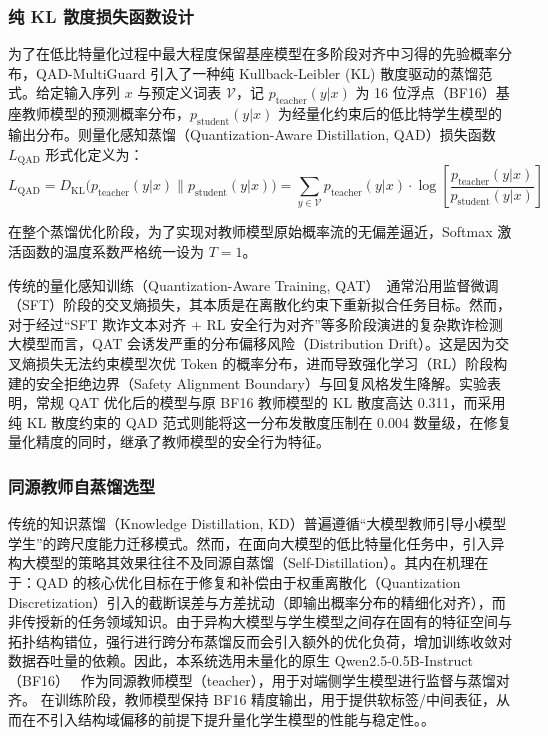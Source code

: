 \documentclass[11pt, a4paper]{article}
\begin{document}
\subsubsection{纯 KL 散度损失函数设计}

为了在低比特量化过程中最大程度保留基座模型在多阶段对齐中习得的先验概率分布，QAD-MultiGuard 引入了一种纯 Kullback-Leibler (KL) 散度驱动的蒸馏范式。给定输入序列 $x$ 与预定义词表 $\mathcal{V}$，记 $p_{\text{teacher}}(y|x)$ 为 16 位浮点（BF16）基座教师模型的预测概率分布，$p_{\text{student}}(y|x)$ 为经量化约束后的低比特学生模型的输出分布。则量化感知蒸馏（Quantization-Aware Distillation, QAD）损失函数 $L_{\text{QAD}}$ 形式化定义为：
\begin{equation}
    L_{\text{QAD}} = D_{\text{KL}}\big( p_{\text{teacher}}(y|x) \parallel p_{\text{student}}(y|x) \big) = \sum_{y \in \mathcal{V}} p_{\text{teacher}}(y|x) \cdot \log \left[ \frac{p_{\text{teacher}}(y|x)}{p_{\text{student}}(y|x)} \right]
\end{equation}

在整个蒸馏优化阶段，为了实现对教师模型原始概率流的无偏差逼近，Softmax 激活函数的温度系数严格统一设为 $T = 1$。

传统的量化感知训练（Quantization-Aware Training, QAT）~\cite{24,25,26}通常沿用监督微调（SFT）阶段的交叉熵损失，其本质是在离散化约束下重新拟合任务目标。然而，对于经过“SFT 欺诈文本对齐 + RL 安全行为对齐”等多阶段演进的复杂欺诈检测大模型而言，QAT 会诱发严重的分布偏移风险（Distribution Drift）。这是因为交叉熵损失无法约束模型次优 Token 的概率分布，进而导致强化学习（RL）阶段构建的安全拒绝边界（Safety Alignment Boundary）与回复风格发生降解。实验表明，常规 QAT 优化后的模型与原 BF16 教师模型的 KL 散度高达 0.311，而采用纯 KL 散度约束的 QAD 范式则能将这一分布发散度压制在 0.004 数量级，在修复量化精度的同时，继承了教师模型的安全行为特征。

\subsubsection{同源教师自蒸馏选型}

传统的知识蒸馏（Knowledge Distillation, KD）普遍遵循“大模型教师引导小模型学生”的跨尺度能力迁移模式。然而，在面向大模型的低比特量化任务中，引入异构大模型的策略其效果往往不及同源自蒸馏（Self-Distillation）。其内在机理在于：QAD 的核心优化目标在于修复和补偿由于权重离散化（Quantization Discretization）引入的截断误差与方差扰动（即输出概率分布的精细化对齐），而非传授新的任务领域知识。由于异构大模型与学生模型之间存在固有的特征空间与拓扑结构错位，强行进行跨分布蒸馏反而会引入额外的优化负荷，增加训练收敛对数据吞吐量的依赖。因此，本系统选用未量化的原生 Qwen2.5-0.5B-Instruct（BF16）~\cite{27,28,29} 作为同源教师模型（teacher），用于对端侧学生模型进行监督与蒸馏对齐。
在训练阶段，教师模型保持 BF16 精度输出，用于提供软标签/中间表征，从而在不引入结构域偏移的前提下提升量化学生模型的性能与稳定性。。
\end{document}
